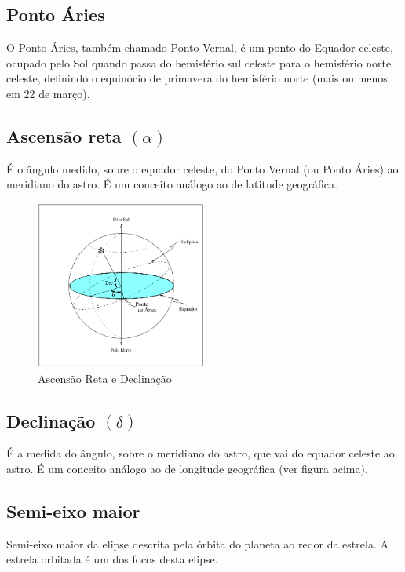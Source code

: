 \documentclass[12pt, a4paper]{article}
\begin{document}
	\subsection{Ponto Áries}
	
	O Ponto Áries, também chamado Ponto Vernal,	é um ponto do Equador celeste, ocupado pelo Sol quando passa do hemisfério
	sul celeste para o hemisfério norte celeste, definindo o equinócio de primavera do hemisfério norte (mais ou menos em 22 de março).

	\subsection{Ascensão reta $(\alpha)$}
	
	É o ângulo medido, sobre o equador celeste, do Ponto Vernal (ou Ponto Áries) ao meridiano do astro. É um conceito análogo ao de latitude geográfica.

	\begin{figure}[H]
		\centering
		\includegraphics[width=0.5\textwidth]{right_ascension_and_declination.png}
		\caption{Ascensão Reta e Declinação}
	\end{figure}

	\subsection{Declinação $(\delta)$}
	É a medida do ângulo, sobre o meridiano do astro, que vai do equador celeste ao astro. É um conceito análogo ao de longitude geográfica (ver figura acima).
	
	\subsection{Semi-eixo maior}
	Semi-eixo maior da elipse descrita pela órbita do planeta ao redor da estrela. A estrela orbitada é um dos focos desta elipse.
\end{document}
